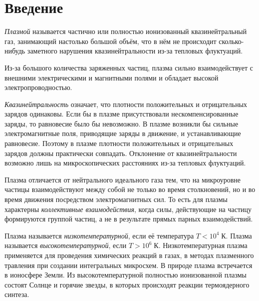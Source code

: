 \section*{Введение}

\textit{Плазмой} называется частично или полностью ионизованный квазинейтральный газ, занимающий настолько большой объём, что в нём не происходит сколько-нибудь заметного нарушения квазинейтральности из-за тепловых флуктуаций. 

Из-за большого количества заряженных частиц, плазма сильно взаимодействует с внешними электрическими и магнитными полями и обладает высокой электропроводностью. 

\textit{Квазинейтральность} означает, что плотности положительных и отрицательных зарядов одинаковы. Если бы в плазме присутствовали нескомпенсированные заряды, то равновесие было бы невозможно. В плазме возникли бы сильные электромагнитные поля, приводящие заряды в движение, и устанавливающие равновесие. Поэтому в плазме плотности положительных и отрицательных зарядов должны практически совпадать. Отклонение от квазинейтральности возможно лишь на микроскопических расстояниях из-за тепловых флуктуаций.

Плазма отличается от нейтрального идеального газа тем, что на микроуровне частицы взаимодействуют между собой не только во время столкновений, но и во время движения посредством электромагнитных сил. То есть для плазмы характерны \textit{коллективные взаимодействия}, когда силы, действующие на частицу формируются группой частиц, а не в результате прямых парных взаимодействий. 

Плазма называется \textit{низкотемпературной}, если её температура  $T < 10^4 \; К$. Плазма называется \textit{высокотемпературной}, если $T > 10^6 \; К$. Низкотемпературная плазма применяется для проведения химических реакций в газах, в методах плазменного травления при создании интегральных микросхем. В природе плазма встречается в ионосфере Земли. Из высокотемпературной полностью ионизованной плазмы состоят Солнце и горячие звезды, в которых происходят реакции термоядерного синтеза.